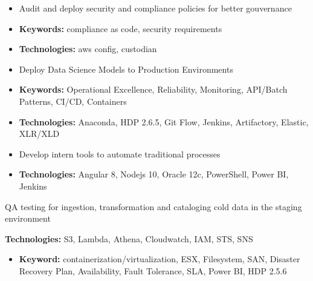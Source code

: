\documentclass[10pt,a4paper,normalphoto]{altacv}
\begin{document}
\begin{paracol}{2}
\begin{itemize}
\item Audit and deploy security and compliance policies for better gouvernance
\item \textbf{Keywords:} compliance as code, security requirements
\item \textbf{Technologies:} aws config, custodian
\end{itemize}

\divider

\begin{itemize}
\item Deploy Data Science Models to Production Environments
\item \textbf{Keywords:} Operational Excellence, Reliability, Monitoring, API/Batch Patterns, CI/CD, Containers
\item \textbf{Technologies:} Anaconda, HDP 2.6.5, Git Flow, Jenkins, Artifactory, Elastic, XLR/XLD
\end{itemize}

\divider

\begin{itemize}
\item Develop intern tools to automate traditional processes
\item \textbf{Technologies:} Angular 8, Nodejs 10, Oracle 12c, PowerShell, Power BI, Jenkins
\end{itemize}
\medskip

\divider
{}
\item QA testing for ingestion, transformation and cataloging cold data in the staging environment  
\item \textbf{Technologies:} S3, Lambda, Athena, Cloudwatch, IAM, STS, SNS
\medskip


\begin{itemize}
\item \textbf{Keyword:} containerization/virtualization, ESX, Filesystem, SAN, Disaster Recovery Plan, Availability, Fault Tolerance, SLA, Power BI, HDP 2.5.6
\medskip
\end{itemize}


\end{paracol}
\end{document}
